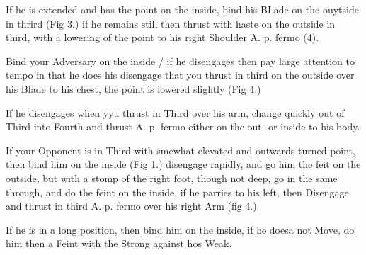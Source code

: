 \newpage


\newpage


\exercise{}
If he is extended and has the point on the inside, bind his BLade on
the ouytside in thrird (Fig 3.) if he remains still then thrust with
haste on the outside in third, with a lowering of the point to his
right Shoulder A. p. fermo (4).

\exercise{}
Bind your Adversary on the inside / if he disengages then pay large
attention to tempo in that he does his disengage that you thrust in
third on the outside over his Blade to his chest, the point is lowered
slightly (Fig 4.)

If he disengages when yyu thrust in Third over his arm, change quickly
out of Third into Fourth and thrust A. p. fermo either on the out- or
inside to his body.

\exercise{}
If your Opponent is in Third with smewhat elevated and outwards-turned
point, then bind him on the inside (Fig 1.) disengage rapidly, and go
him the feit on the outside, but with a stomp of the right foot,
though not deep, go in the same through, and do the feint on the
inside, if he parries to his left, then Disengage and thrust in third
A. p. fermo over his right Arm (fig 4.)

\exercise{}
If he is in a long position, then bind him on the inside, if he doesa
not Move, do him then a Feint with the Strong against hos Weak.
